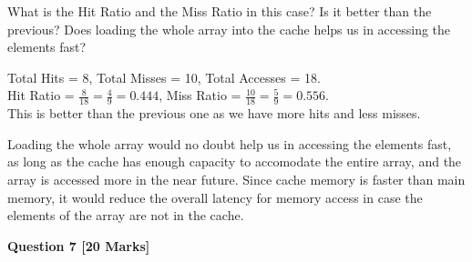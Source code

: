 \documentclass[addpoints]{exam}
\begin{document}
\begin{sloppypar}
\begin{questions}
    What is the Hit Ratio and the Miss Ratio in this case? Is it better than the previous? Does loading the whole array into the cache helps us in accessing the elements fast?
    \begin{solution}
        Total Hits = 8, Total Misses = 10, Total Accesses = 18. \\ 
        Hit Ratio = $ \frac{8}{18} = \frac{4}{9} = 0.444 $, Miss Ratio = $ \frac{10}{18} = \frac{5}{9} = 0.556 $. \\ This is better than the previous one as we have more hits and less misses.

        Loading the whole array would no doubt help us in accessing the elements fast, as long as the cache has enough capacity to accomodate the entire array, and the array is accessed more in the near future. Since cache memory is faster than main memory, it would reduce the overall latency for memory access in case the elements of the array are not in the cache.
    \end{solution}
    \pagebreak
    \question[20]
    \begin{center}
        \textbf{Question 7 [20 Marks]}
    \end{center}

\end{questions}
\end{sloppypar}
\end{document}
